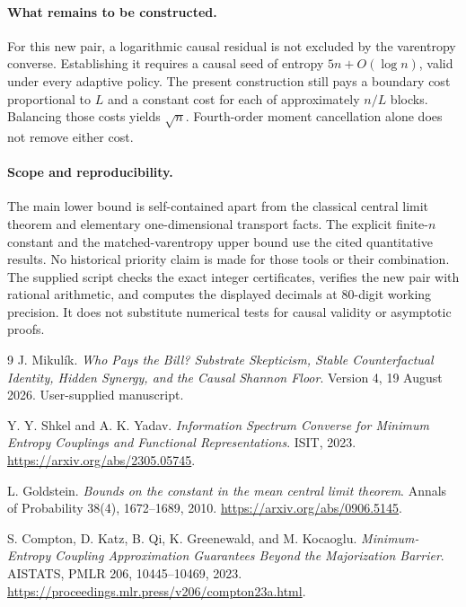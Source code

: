 \documentclass[11pt,a4paper]{article}
\begin{document}
\paragraph{What remains to be constructed.}
For this new pair, a logarithmic causal residual is not excluded by the
varentropy converse. Establishing it requires a causal seed of entropy
$5n+O(\log n)$, valid under every adaptive policy. The present construction
still pays a boundary cost proportional to $L$ and a constant cost for each
of approximately $n/L$ blocks. Balancing those costs yields $\sqrt n$.
Fourth-order moment cancellation alone does not remove either cost.

\paragraph{Scope and reproducibility.}
The main lower bound is self-contained apart from the classical central
limit theorem and elementary one-dimensional transport facts. The explicit
finite-$n$ constant and the matched-varentropy upper bound use the cited
quantitative results. No historical priority claim is made for those tools
or their combination. The supplied script checks the exact integer
certificates, verifies the new pair with rational arithmetic, and computes
the displayed decimals at 80-digit working precision. It does not substitute
numerical tests for causal validity or asymptotic proofs.

\begin{thebibliography}{9}
J. Mikul\'ik.
\emph{Who Pays the Bill? Substrate Skepticism, Stable Counterfactual
Identity, Hidden Synergy, and the Causal Shannon Floor}.
Version 4, 19 August 2026. User-supplied manuscript.

Y. Y. Shkel and A. K. Yadav.
\emph{Information Spectrum Converse for Minimum Entropy Couplings and
Functional Representations}. ISIT, 2023.
\url{https://arxiv.org/abs/2305.05745}.

L. Goldstein.
\emph{Bounds on the constant in the mean central limit theorem}.
Annals of Probability 38(4), 1672--1689, 2010.
\url{https://arxiv.org/abs/0906.5145}.

S. Compton, D. Katz, B. Qi, K. Greenewald, and M. Kocaoglu.
\emph{Minimum-Entropy Coupling Approximation Guarantees Beyond the
Majorization Barrier}. AISTATS, PMLR 206, 10445--10469, 2023.
\url{https://proceedings.mlr.press/v206/compton23a.html}.
\end{thebibliography}
\end{document}
